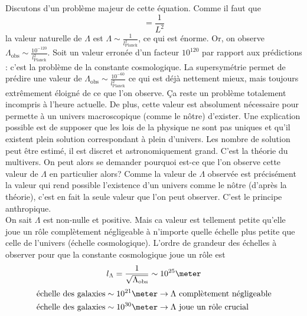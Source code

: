 \documentclass[a4paper,11pt]{report}
\theoremstyle{definition}
\theoremstyle{plain}
\theoremstyle{definition}
\theoremstyle{remark}
\begin{document}
            Discutons d'un problème majeur de cette équation. Comme il faut que
            \begin{equation}
                [\Lambda]=\frac{1}{L^2}
            \end{equation}
            la valeur naturelle de $\Lambda$ est $\Lambda\sim \frac{1}{l_{\text{Planck}}^2}$, ce qui est énorme. Or, on observe $\Lambda_{\text{obs}}\sim\frac{10^{-120}}{l_{\text{Planck}}^2}$. Soit un valeur erronée d'un facteur $10^{120}$ par rapport aux prédictions : c'est la problème de la constante cosmologique. La supersymétrie permet de prédire une valeur de $\Lambda_{\text{obs}}\sim\frac{10^{-60}}{l_{\text{Planck}}^2}$ ce qui est déjà nettement mieux, mais toujours extrêmement éloigné de ce que l'on observe. Ça reste un problème totalement incompris à l'heure actuelle. De plus, cette valeur est absolument nécessaire pour permette à un univers macroscopique (comme le nôtre) d'exister. Une explication possible est de supposer que les lois de la physique ne sont pas uniques et qu'il existent plein solution correspondant à plein d'univers. Les nombre de solution peut être estimé, il est discret et astronomiquement grand. C'est la théorie du multivers. On peut alors se demander pourquoi est-ce que l'on observe cette valeur de $\Lambda$ en particulier alors? Comme la valeur de $\Lambda$ observée est précisément la valeur qui rend possible l'existence d'un univers comme le nôtre (d'après la théorie), c'est en fait la seule valeur que l'on peut observer. C'est le principe anthropique.\\
            
            On sait $\Lambda$ est non-nulle et positive. Mais ca valeur est tellement petite qu'elle joue un rôle complètement négligeable à n'importe quelle échelle plus petite que celle de l'univers (échelle cosmologique). L'ordre de grandeur des échelles à observer pour que la constante cosmologique joue un rôle est 
            \begin{equation}
                l_\Lambda = \frac{1}{\sqrt{\Lambda_{\text{obs}}}}\sim 10^{25}\meter
            \end{equation}
            \begin{align}
                \text{échelle des galaxies} \sim 10^{21}\meter &\to \text{$\Lambda$ complètement négligeable}\\
                \text{échelle des galaxies} \sim 10^{30}\meter &\to \text{$\Lambda$ joue un rôle crucial}
            \end{align}
            
\end{document}
